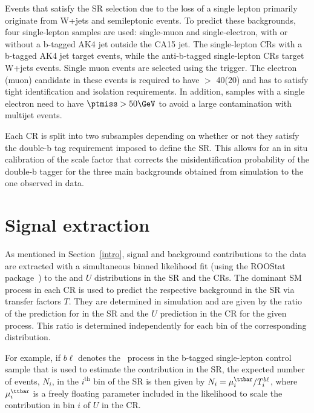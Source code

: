 Events that satisfy the SR selection due to the loss of a single lepton primarily originate from W+jets and semileptonic \ttbar events.
To predict these backgrounds, four single-lepton samples are used: single-muon and single-electron, with or without a b-tagged AK4 jet outside the CA15 jet.
The single-lepton CRs with a b-tagged AK4 jet target \ttbar events, while the anti-b-tagged single-lepton CRs target W+jets events.
Single muon events are selected using the \MET trigger.
The electron (muon) candidate in these events is required to have \pt $>$ 40\GeV (20\GeV) and has to satisfy tight identification and isolation requirements.
In addition, samples with a single electron need to have $\ptmiss>50\GeV$ to avoid a large contamination with multijet events.


Each CR is split into two subsamples depending on whether or
not they satisfy the double-b tag requirement imposed to define the SR. This allows for an in situ calibration of the scale factor that corrects the misidentification probability of the double-b tagger for the three main backgrounds obtained from simulation to the one observed in data. 

\section{Signal extraction}

As mentioned in Section~\ref{intro}, signal and background contributions to the data are extracted with a simultaneous binned likelihood fit (using the ROOStat package~\cite{roostats}) to the \MET and $U$ distributions in the SR and the CRs.
%
The dominant SM process in each CR is used to predict the respective background in the SR via transfer factors $T$. They are determined in simulation and are given by the ratio of the prediction for \ptmiss in the SR and the $U$ prediction in the CR for the given process. This ratio is determined independently for each bin of the corresponding distribution.
  
For example, if $b\ell$ denotes the \ttbar~process in the b-tagged single-lepton control sample that is used to estimate the \ttbar contribution in the SR, the expected number of \ttbar events, $N_{i}$, in the $i^\text{th}$ bin of the SR is then given by $N_{i}= \mu^{\ttbar}_{i}/T^{b\ell}_{i}$, where  $\mu^{\ttbar}_i$ is a freely floating parameter included in the likelihood to scale the \ttbar contribution in bin $i$ of $U$ in the CR.

